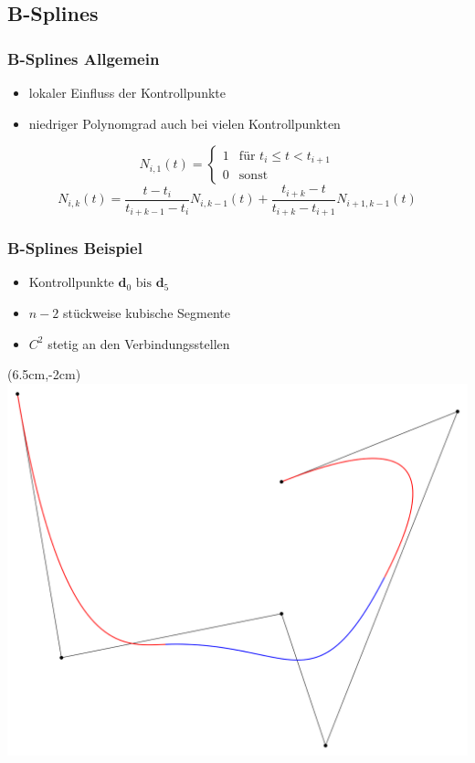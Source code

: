 \documentclass[11pt]{beamer}
\begin{document}
\subsection{B-Splines}
\begin{frame}
\frametitle{B-Splines Allgemein}
\begin{itemize}
\item lokaler Einfluss der Kontrollpunkte
\item niedriger Polynomgrad auch bei vielen Kontrollpunkten
\end{itemize}
\bigskip
\begin{equation}
N_{i,1}(t) = \begin{cases}
                1 & \text{für } t_{i} \leq t < t_{i+1} \\
                0 & \text{sonst}
             \end{cases}
\end{equation}
\begin{equation}
N_{i,k}(t) = \frac{t - t_{i}}{t_{i+k-1} - t_{i}}N_{i,k-1}(t) + \frac{t_{i+k} - t}{t_{i+k} - t_{i+1}}N_{i+1,k-1}(t)
\end{equation}
\end{frame}

\begin{frame}
\frametitle{B-Splines Beispiel}
\begin{itemize}
\item Kontrollpunkte $\mathbf{d}_0 \text{ bis } \mathbf{d}_5$
\item $n - 2$ stückweise kubische Segmente
\item $C^2$ stetig an den Verbindungsstellen
\end{itemize}
\begin{textblock*}{100mm}(6.5cm,-2cm)
\includegraphics[width=0.5\linewidth]{./B-spline_curve.png}
\end{textblock*}
\end{frame}
\end{document}
